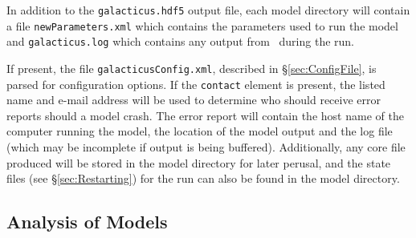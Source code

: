 In addition to the {\tt galacticus.hdf5} output file, each model directory will contain a file {\tt newParameters.xml} which contains the parameters used to run the model and {\tt galacticus.log} which contains any output from \glc\ during the run.

If present, the file {\tt galacticusConfig.xml}, described in \S\ref{sec:ConfigFile}, is parsed for configuration options. If the {\tt contact} element is present, the listed name and e-mail address will be used to determine who should receive error reports should a model crash. The error report will contain the host name of the computer running the model, the location of the model output and the log file (which may be incomplete if output is being buffered). Additionally, any core file produced will be stored in the model directory for later perusal, and the state files (see \S\ref{sec:Restarting}) for the run can also be found in the model directory.

\subsection{Analysis of Models}\label{sec:AnalysisScripts}

